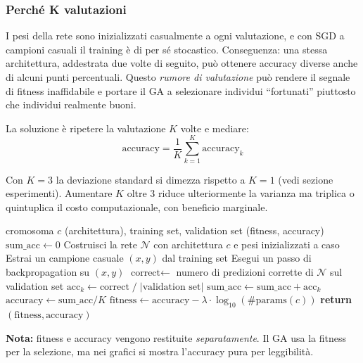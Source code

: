 \documentclass[11pt,a4paper]{article}
\begin{document}
\subsubsection{Perché K valutazioni}

I pesi della rete sono inizializzati casualmente a ogni valutazione, e
con SGD a campioni casuali il training è di per sé stocastico.
Conseguenza: una stessa architettura, addestrata due volte di seguito,
può ottenere accuracy diverse anche di alcuni punti percentuali. Questo
\emph{rumore di valutazione} può rendere il segnale di fitness
inaffidabile e portare il GA a selezionare individui ``fortunati''
piuttosto che individui realmente buoni.

La soluzione è ripetere la valutazione $K$ volte e mediare:
\[
    \text{accuracy} = \frac{1}{K}\sum_{k=1}^{K} \text{accuracy}_k
\]

Con $K=3$ la deviazione standard si dimezza rispetto a $K=1$ (vedi
sezione esperimenti). Aumentare $K$ oltre $3$ riduce ulteriormente la
varianza ma triplica o quintuplica il costo computazionale, con beneficio
marginale.

\begin{algorithm}[H]
\caption{Valutazione della fitness di un individuo}
\begin{algorithmic}[1]
\Require cromosoma $c$ (architettura), training set, validation set
\Ensure (fitness, accuracy)
\State $\text{sum\_acc} \gets 0$
    \State Costruisci la rete $\mathcal{N}$ con architettura $c$ e pesi inizializzati a caso
        \State Estrai un campione casuale $(x, y)$ dal training set
        \State Esegui un passo di backpropagation su $(x, y)$
    \EndFor
    \State $\text{correct} \gets$ numero di predizioni corrette di $\mathcal{N}$ sul validation set
    \State $\text{acc}_k \gets \text{correct} \;/\; |\text{validation set}|$
    \State $\text{sum\_acc} \gets \text{sum\_acc} + \text{acc}_k$
\EndFor
\State $\text{accuracy} \gets \text{sum\_acc} / K$
\State $\text{fitness} \gets \text{accuracy} - \lambda \cdot \log_{10}(\#\text{params}(c))$
\State \textbf{return} $(\text{fitness}, \text{accuracy})$
\end{algorithmic}
\end{algorithm}

\textbf{Nota:} fitness e accuracy vengono restituite \emph{separatamente}.
Il GA usa la fitness per la selezione, ma nei grafici si mostra
l'accuracy pura per leggibilità.

\end{document}
